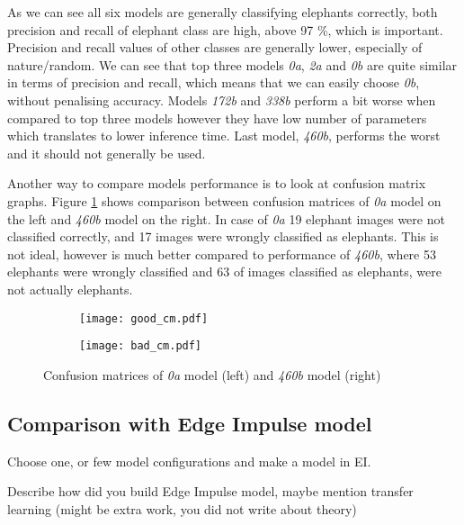 As we can see all six models are generally classifying elephants correctly, both precision and recall of elephant class are high, above 97 \%, which is important.
Precision and recall values of other classes are generally lower, especially of nature/random.
We can see that top three models \textit{0a}, \textit{2a} and \textit{0b} are quite similar in terms of precision and recall, which means that we can easily choose \textit{0b}, without penalising accuracy. 
Models \textit{172b} and \textit{338b} perform a bit worse when compared to top three models however they have low number of parameters which translates to lower inference time.
Last model, \textit{460b}, performs the worst and it should not generally be used.

Another way to compare models performance is to look at confusion matrix graphs.
Figure \ref{double_cm} shows comparison between confusion matrices of \textit{0a} model on the left and \textit{460b} model on the right.
In case of \textit{0a} 19 elephant images were not classified correctly, and 17 images were wrongly classified as elephants.
This is not ideal, however is much better compared to performance of \textit{460b}, where 53 elephants were wrongly classified and 63 of images classified as elephants, were not actually elephants.

\begin{figure}[ht]
    \begin{subfigure}{0.5\textwidth}
        \centering
        \texttt{[image: good\_cm.pdf]} 
    \end{subfigure}
    \begin{subfigure}{0.5\textwidth}
        \centering
        \texttt{[image: bad\_cm.pdf]}
    \end{subfigure}
    \caption{Confusion matrices of \textit{0a} model (left) and \textit{460b} model (right)}
    \label{double_cm}
\end{figure}


\subsection{ Comparison with Edge Impulse model}

Choose one, or few model configurations and make a model in EI.

Describe how did you build Edge Impulse model, maybe mention transfer learning (might be extra work, you did not write about theory)




